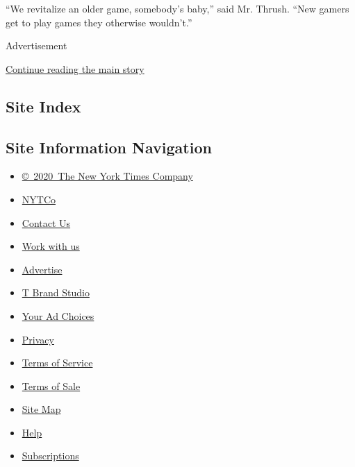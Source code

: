 ``We revitalize an older game, somebody's baby,'' said Mr. Thrush. ``New
gamers get to play games they otherwise wouldn't.''

Advertisement

\protect\hyperlink{after-bottom}{Continue reading the main story}

\hypertarget{site-index}{%
\subsection{Site Index}\label{site-index}}

\hypertarget{site-information-navigation}{%
\subsection{Site Information
Navigation}\label{site-information-navigation}}

\begin{itemize}
\tightlist
\item
  \href{https://help.nytimes.com/hc/en-us/articles/115014792127-Copyright-notice}{©~2020~The
  New York Times Company}
\end{itemize}

\begin{itemize}
\tightlist
\item
  \href{https://www.nytco.com/}{NYTCo}
\item
  \href{https://help.nytimes.com/hc/en-us/articles/115015385887-Contact-Us}{Contact
  Us}
\item
  \href{https://www.nytco.com/careers/}{Work with us}
\item
  \href{https://nytmediakit.com/}{Advertise}
\item
  \href{http://www.tbrandstudio.com/}{T Brand Studio}
\item
  \href{https://www.nytimes.com/privacy/cookie-policy\#how-do-i-manage-trackers}{Your
  Ad Choices}
\item
  \href{https://www.nytimes.com/privacy}{Privacy}
\item
  \href{https://help.nytimes.com/hc/en-us/articles/115014893428-Terms-of-service}{Terms
  of Service}
\item
  \href{https://help.nytimes.com/hc/en-us/articles/115014893968-Terms-of-sale}{Terms
  of Sale}
\item
  \href{https://spiderbites.nytimes.com}{Site Map}
\item
  \href{https://help.nytimes.com/hc/en-us}{Help}
\item
  \href{https://www.nytimes.com/subscription?campaignId=37WXW}{Subscriptions}
\end{itemize}
